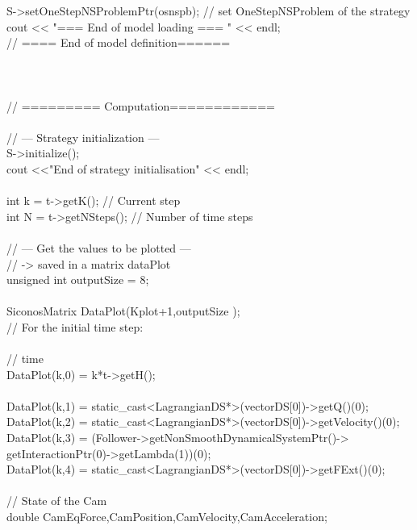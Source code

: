 \begin{tabbing}
 \> S->setOneStepNSProblemPtr(osnspb); // set OneStepNSProblem of the
 strategy\\
 \> cout << "=== End of model loading === " << endl;\\
 \> // ==== End of model definition======\\
\\
\\
\\
 \> // ========= Computation============\\
\\
 \> // --- Strategy initialization ---\\
 \> S->initialize();\\
 \> cout <<"End of strategy initialisation" << endl;\\
\\

 \> int k = t->getK(); \> \> \> \> // Current step\\
 \> int N = t->getNSteps(); \> \> \> \> // Number of time steps\\
\\
 \> // --- Get the values to be plotted ---\\
 \> // -> saved in a matrix dataPlot\\
 \> unsigned int outputSize = 8;\\
\\
 \> SiconosMatrix DataPlot(Kplot+1,outputSize );\\
 \>   // For the initial time step:\\
 \\
 \> // time\\
 \>     DataPlot(k,0) = k*t->getH();\\
 \\
 \>     DataPlot(k,1) = static\_cast<LagrangianDS*>(vectorDS[0])->getQ()(0);\\
 \>     DataPlot(k,2) = static\_cast<LagrangianDS*>(vectorDS[0])->getVelocity()(0);\\
 \>     DataPlot(k,3) = (Follower->getNonSmoothDynamicalSystemPtr()->\\
 \> \> getInteractionPtr(0)->getLambda(1))(0);\\
 \>     DataPlot(k,4) = static\_cast<LagrangianDS*>(vectorDS[0])->getFExt()(0);\\
 \\
 \>     // State of the Cam\\
 \>      double CamEqForce,CamPosition,CamVelocity,CamAcceleration;\\


\end{tabbing}
